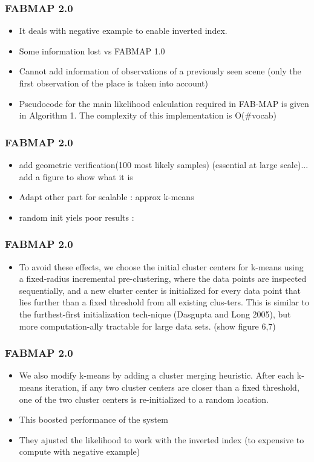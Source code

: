 \begin{frame}
    \frametitle{FABMAP 2.0}
    \begin{itemize}
        \item It deals with negative example to enable inverted index.
        \item Some information lost vs FABMAP 1.0
        \item Cannot add information of observations of a previously seen scene (only the first observation of the place is taken into account)
        \item Pseudocode for the main likelihood calculation required in FAB-MAP is given in Algorithm 1. The complexity of this implementation is O(\#vocab)
    \end{itemize}
\end{frame}

\begin{frame}
    \frametitle{FABMAP 2.0}
    \begin{itemize}
        \item add geometric verification(100 most likely samples) (essential at large scale)... add a figure to show what it is
        \item Adapt other part for scalable : approx k-means
        \item random init yiels poor results :
    \end{itemize}
\end{frame}

\begin{frame}
    \frametitle{FABMAP 2.0}
    \begin{itemize}
        \item To avoid these effects, we choose the initial cluster centers for k-means using a fixed-radius incremental pre-clustering, where the data points are inspected sequentially, and a new cluster center is initialized for every data point that lies further than a fixed threshold from all existing clus-ters. This is similar to the furthest-first initialization tech-nique (Dasgupta and Long 2005), but more computation-ally tractable for large data sets. (show figure 6,7)
    \end{itemize}
\end{frame}

\begin{frame}
    \frametitle{FABMAP 2.0}
    \begin{itemize}
        \item We also modify k-means by adding a cluster merging heuristic. After each k-means iteration, if any two cluster centers are closer than a fixed threshold, one of the two cluster centers is re-initialized to a random location.
        \item This boosted performance of the system
        \item They ajusted the likelihood to work with the inverted index (to expensive to compute with negative example)
    \end{itemize}
\end{frame}

